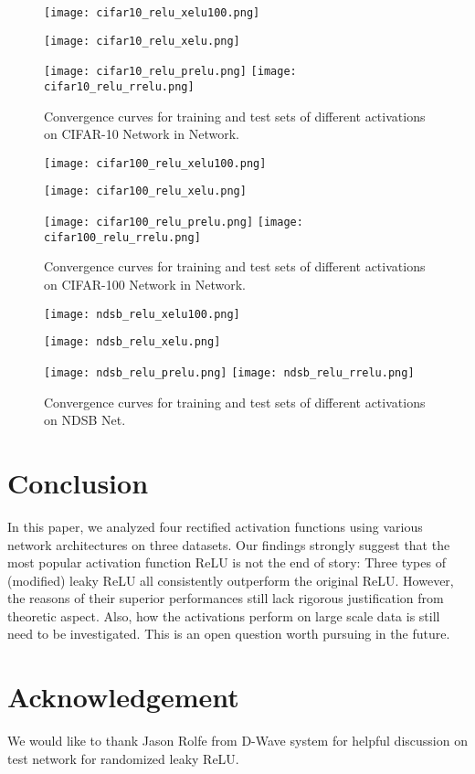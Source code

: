 \documentclass{article}
\begin{document}
\begin{figure*}[!htb]
\centering
{}
  \texttt{[image: cifar10\_relu\_xelu100.png]}

\endminipage\hfill
{}
  \texttt{[image: cifar10\_relu\_xelu.png]}

\endminipage\hfill
{}\texttt{[image: cifar10\_relu\_prelu.png]}
\endminipage
{}
  \texttt{[image: cifar10\_relu\_rrelu.png]}

\endminipage\hfill
\caption{Convergence curves for training and test sets of different activations on CIFAR-10 Network in Network.}
\label{fig:cifar}
\end{figure*}


\begin{figure*}[!htb]
\centering
{}
  \texttt{[image: cifar100\_relu\_xelu100.png]}

\endminipage\hfill
{}
  \texttt{[image: cifar100\_relu\_xelu.png]}

\endminipage\hfill
{}\texttt{[image: cifar100\_relu\_prelu.png]}
\endminipage
{}
  \texttt{[image: cifar100\_relu\_rrelu.png]}

\endminipage\hfill
\caption{Convergence curves for training and test sets of different activations on CIFAR-100 Network in Network.}
\label{fig:cifar100}
\end{figure*}

\begin{figure*}[!htb]
\centering
{}
  \texttt{[image: ndsb\_relu\_xelu100.png]}

\endminipage\hfill
{}
  \texttt{[image: ndsb\_relu\_xelu.png]}

\endminipage\hfill
{}\texttt{[image: ndsb\_relu\_prelu.png]}
\endminipage
{}
  \texttt{[image: ndsb\_relu\_rrelu.png]}

\endminipage\hfill
\caption{Convergence curves for training and test sets of different activations on NDSB Net.}
\label{fig:ndsb}
\end{figure*}

\section{Conclusion}
In this paper, we analyzed four rectified activation functions using various network architectures on three datasets. Our findings strongly suggest that the most popular activation function ReLU is not the end of story: Three types of (modified) leaky ReLU all consistently outperform the original ReLU. However, the reasons of their superior performances still lack rigorous justification from theoretic aspect. Also, how the activations perform on large scale data is still need to be investigated. This is an open question worth pursuing in the future. 

\section*{Acknowledgement}
We would like to thank Jason Rolfe from D-Wave system for helpful discussion on test network for randomized leaky ReLU.


\end{document}
